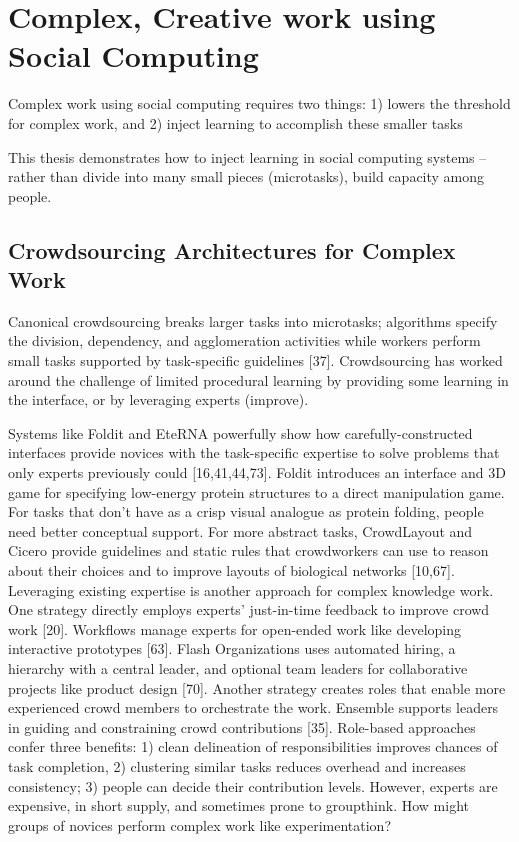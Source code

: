 \section{Complex, Creative work using Social Computing}

Complex work using social computing requires two things:
1) lowers the threshold for complex work, and 
2) inject learning to accomplish these smaller tasks

This thesis demonstrates how to inject learning in social computing systems
-- rather than divide into many small pieces (microtasks), build capacity among people. 

\subsection{Crowdsourcing Architectures for Complex Work}
Canonical crowdsourcing breaks larger tasks into microtasks; algorithms specify the division,
dependency, and agglomeration activities while workers perform small tasks supported by task-specific
guidelines [37]. Crowdsourcing has worked around the challenge of limited procedural
learning by providing some learning in the interface, or by leveraging experts (improve).

Systems like Foldit and EteRNA powerfully show how carefully-constructed interfaces provide
novices with the task-specific expertise to solve problems that only experts previously could
[16,41,44,73]. Foldit introduces an interface and 3D game for specifying low-energy protein structures
to a direct manipulation game. For tasks that don’t have as a crisp visual analogue as protein
folding, people need better conceptual support. For more abstract tasks, CrowdLayout and Cicero
provide guidelines and static rules that crowdworkers can use to reason about their choices and
to improve layouts of biological networks [10,67].
Leveraging existing expertise is another approach for complex knowledge work. One strategy
directly employs experts’ just-in-time feedback to improve crowd work [20]. Workflows manage
experts for open-ended work like developing
interactive prototypes [63]. Flash Organizations
uses automated hiring, a hierarchy with
a central leader, and optional team leaders for
collaborative projects like product design [70].
Another strategy creates roles that enable
more experienced crowd members to orchestrate
the work. Ensemble supports leaders in
guiding and constraining crowd contributions
[35]. Role-based approaches confer three benefits:
1) clean delineation of responsibilities improves
chances of task completion, 2) clustering
similar tasks reduces overhead and increases
consistency; 3) people can decide their
contribution levels. However, experts are expensive,
in short supply, and sometimes prone
to groupthink. How might groups of novices
perform complex work like experimentation?

